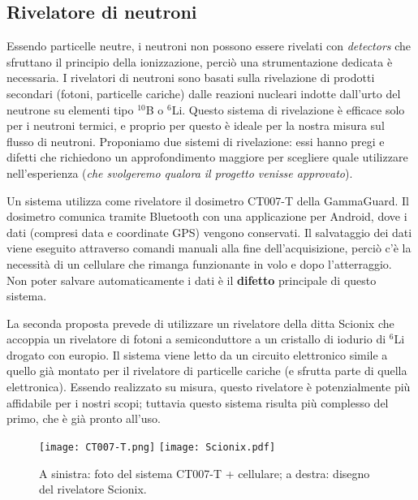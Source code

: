 \subsection{Rivelatore di neutroni}
Essendo particelle neutre, i neutroni non possono essere rivelati con \emph{detectors} che sfruttano il principio della ionizzazione, perciò una strumentazione dedicata è necessaria.
I rivelatori di neutroni sono basati sulla rivelazione di prodotti secondari (fotoni, particelle cariche) dalle reazioni nucleari indotte dall'urto del neutrone su elementi tipo $^{10}$B o $^6$Li. Questo sistema di rivelazione è efficace solo per i neutroni termici, e proprio per questo è ideale per la nostra misura sul flusso di neutroni. 
Proponiamo due sistemi di rivelazione: essi hanno pregi e difetti che richiedono un approfondimento maggiore per scegliere quale utilizzare nell'esperienza (\emph{che svolgeremo qualora il progetto venisse approvato}). 

Un sistema utilizza come rivelatore il dosimetro CT007-T della GammaGuard. Il dosimetro comunica tramite Bluetooth con una applicazione per Android, dove i dati (compresi data e coordinate GPS) vengono conservati. Il salvataggio dei dati viene eseguito attraverso comandi manuali alla fine dell'acquisizione, perciò c'è la necessità di un cellulare che rimanga funzionante in volo e dopo l'atterraggio. Non poter salvare automaticamente i dati è il \textbf{difetto} principale di questo sistema.

La seconda proposta prevede di utilizzare un rivelatore della ditta Scionix che accoppia un rivelatore di fotoni a semiconduttore a un cristallo di iodurio di $^6 $Li drogato con europio. Il sistema viene letto da un circuito elettronico simile a quello già montato per il rivelatore di particelle cariche (e sfrutta parte di quella elettronica). Essendo realizzato su misura, questo rivelatore è potenzialmente più affidabile per i nostri scopi; tuttavia questo sistema risulta più complesso del primo, che è già pronto all'uso. 

\begin{figure}
    \centering
    \texttt{[image: CT007-T.png]}
    \quad
    \texttt{[image: Scionix.pdf]}
    \caption{A sinistra: foto del sistema CT007-T + cellulare; a destra: disegno del rivelatore Scionix.}
    \label{fig:my_label}
\end{figure}
